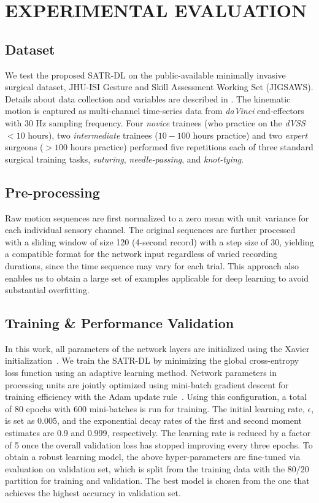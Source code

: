 \documentclass[letterpaper, 10 pt, conference, twoside]{IEEEtran}
\begin{document}
\section{EXPERIMENTAL EVALUATION}
\subsection{Dataset}
We test the proposed SATR-DL on the public-available minimally invasive surgical dataset, JHU-ISI Gesture and Skill Assessment Working Set (JIGSAWS). Details about data collection and variables are described in \cite{gao2014JIGSAW}. The kinematic motion is captured as multi-channel time-series data from \textit{daVinci} end-effectors with 30 Hz sampling frequency. Four \textit{novice} trainees (who practice on the \textit{dVSS} $<10$ hours), two \textit{intermediate} trainees ($10-100$ hours practice) and two \textit{expert} surgeons ($>100$ hours practice) performed five repetitions each of three standard surgical training tasks, \textit{suturing}, \textit{needle-passing}, and \textit{knot-tying}.

\subsection{Pre-processing}
Raw motion sequences are first normalized to a zero mean with unit variance for each individual sensory channel. The original sequences are further processed with a sliding window of size 120 (4-second record) with a step size of 30, yielding a compatible format for the network input regardless of varied recording durations, since the time sequence may vary for each trial. This approach also enables us to obtain a large set of examples applicable for deep learning to avoid substantial overfitting. 

\subsection{Training \& Performance Validation}
In this work, all parameters of the network layers are initialized using the Xavier initialization~\cite{2015DL_review}.
We train the SATR-DL by minimizing the global cross-entropy loss function using an adaptive learning method. 
Network parameters in processing units are jointly optimized using mini-batch gradient descent for training efficiency with the Adam update rule~\cite{kingma2014adam}. Using this configuration, a total of 80 epochs with 600 mini-batches is run for training. The initial learning rate, $\epsilon$, is set as 0.005, and the exponential decay rates of the first and second moment estimates are 0.9 and 0.999, respectively. The learning rate is reduced by a factor of 5 once the overall validation loss has stopped improving every three epochs. To obtain a robust learning model, the above hyper-parameters are fine-tuned via evaluation on validation set, which is split from the training data with the $80/20$ partition for training and validation. The best model is chosen from the one that achieves the highest accuracy in validation set.
\end{document}
